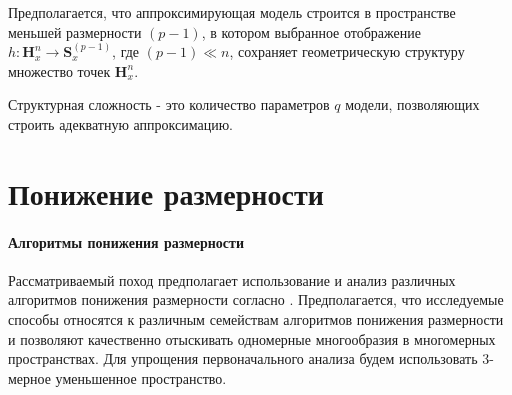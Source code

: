 \documentclass[12pt,twoside]{article}
\begin{document}
Предполагается, что аппроксимирующая модель строится в пространстве меньшей размерности $(p-1)$, в котором выбранное отображение $h: \mathbf{H}_{x}^{n} \xrightarrow{} \mathbf{S}_x^{(p-1)} $, где $(p-1)\ll n$, сохраняет геометрическую структуру множество точек $\mathbf{H}_{x}^{n}$. 

\begin{Def}
Структурная сложность - это количество параметров $q$ модели, позволяющих строить адекватную аппроксимацию.
\end{Def}

\section{Понижение размерности}
\paragraph{Алгоритмы понижения размерности}
Рассматриваемый поход предполагает использование и анализ различных алгоритмов понижения размерности согласно \cite{Maaten2007}.
Предполагается, что исследуемые способы относятся к различным семействам алгоритмов понижения размерности и позволяют качественно отыскивать одномерные многообразия в многомерных пространствах.
Для упрощения первоначального анализа будем использовать 3-мерное уменьшенное пространство.
\end{document}
